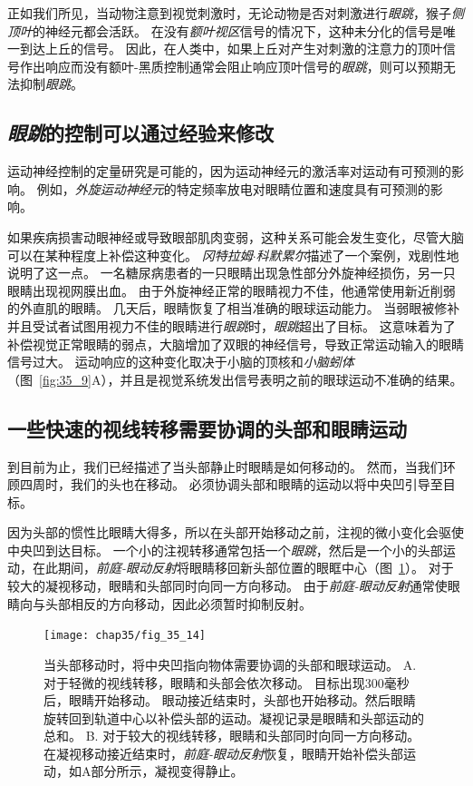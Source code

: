 正如我们所见，当动物注意到视觉刺激时，无论动物是否对刺激进行\textit{眼跳}，猴子\textit{侧顶叶}的神经元都会活跃。
在没有\textit{额叶视区}信号的情况下，这种未分化的信号是唯一到达上丘的信号。
因此，在人类中，如果上丘对产生对刺激的注意力的顶叶信号作出响应而没有额叶-黑质控制通常会阻止响应顶叶信号的\textit{眼跳}，则可以预期无法抑制\textit{眼跳}。



\subsection{\textit{眼跳}的控制可以通过经验来修改}

运动神经控制的定量研究是可能的，因为运动神经元的激活率对运动有可预测的影响。
例如，\textit{外旋运动神经元}的特定频率放电对眼睛位置和速度具有可预测的影响。


如果疾病损害动眼神经或导致眼部肌肉变弱，这种关系可能会发生变化，尽管大脑可以在某种程度上补偿这种变化。
\textit{冈特拉姆$\cdot$科默累尔}描述了一个案例，戏剧性地说明了这一点。
一名糖尿病患者的一只眼睛出现急性部分外旋神经损伤，另一只眼睛出现视网膜出血。
由于外旋神经正常的眼睛视力不佳，他通常使用新近削弱的外直肌的眼睛。
几天后，眼睛恢复了相当准确的眼球运动能力。
当弱眼被修补并且受试者试图用视力不佳的眼睛进行\textit{眼跳}时，\textit{眼跳}超出了目标。
这意味着为了补偿视觉正常眼睛的弱点，大脑增加了双眼的神经信号，导致正常运动输入的眼睛信号过大。
运动响应的这种变化取决于小脑的顶核和\textit{小脑蚓体}（图~\ref{fig:35_9}A），并且是视觉系统发出信号表明之前的眼球运动不准确的结果。



\subsection{一些快速的视线转移需要协调的头部和眼睛运动}

到目前为止，我们已经描述了当头部静止时眼睛是如何移动的。
然而，当我们环顾四周时，我们的头也在移动。
必须协调头部和眼睛的运动以将中央凹引导至目标。


因为头部的惯性比眼睛大得多，所以在头部开始移动之前，注视的微小变化会驱使中央凹到达目标。
一个小的注视转移通常包括一个\textit{眼跳}，然后是一个小的头部运动，在此期间，\textit{前庭-眼动反射}将眼睛移回新头部位置的眼眶中心（图~\ref{fig:35_14}）。
对于较大的凝视移动，眼睛和头部同时向同一方向移动。
由于\textit{前庭-眼动反射}通常使眼睛向与头部相反的方向移动，因此必须暂时抑制反射。


\begin{figure}[htbp]
	\centering
	\texttt{[image: chap35/fig\_35\_14]}
	\caption{当头部移动时，将中央凹指向物体需要协调的头部和眼球运动。
		A. 对于轻微的视线转移，眼睛和头部会依次移动。
		目标出现300毫秒后，眼睛开始移动。
		眼动接近结束时，头部也开始移动。然后眼睛旋转回到轨道中心以补偿头部的运动。凝视记录是眼睛和头部运动的总和\cite{zee1977disorders}。
		B. 对于较大的视线转移，眼睛和头部同时向同一方向移动。
		在凝视移动接近结束时，\textit{前庭-眼动反射}恢复，眼睛开始补偿头部运动，如A部分所示，凝视变得静止\cite{laurutis1986vestibulo}。}
	\label{fig:35_14}
\end{figure}



